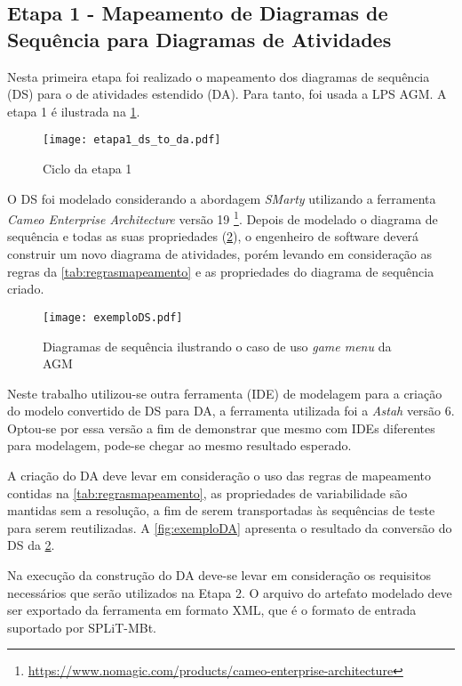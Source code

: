 \subsection{Etapa 1 - Mapeamento de Diagramas de Sequência para Diagramas de Atividades}
\label{cap3subsec:etapa1}

Nesta primeira etapa foi realizado o mapeamento dos diagramas de sequência (DS) para o de atividades estendido (DA). Para tanto, foi usada a LPS AGM. A etapa 1 é ilustrada na \ref{fig:SM_etapa1}. 

\begin{figure}[h!]
	\centering
	\texttt{[image: etapa1\_ds\_to\_da.pdf]}
	\caption{Ciclo da etapa 1}
	\label{fig:SM_etapa1}
\end{figure}


O DS foi modelado considerando a abordagem \textit{SMarty} utilizando a ferramenta \textit{Cameo Enterprise Architecture} versão 19 \footnote{\url{https://www.nomagic.com/products/cameo-enterprise-architecture}}. Depois de modelado o diagrama de sequência e todas as suas propriedades (\ref{fig:exemploDS}), o engenheiro de software deverá construir um novo diagrama de atividades, porém levando em consideração as regras da \ref{tab:regrasmapeamento} e as propriedades do diagrama de sequência criado.


\begin{figure}[h!]
	\centering
	\texttt{[image: exemploDS.pdf]}
	\caption{Diagramas de sequência ilustrando o caso de uso \textit{game menu} da AGM}
	\label{fig:exemploDS}
\end{figure}

Neste trabalho utilizou-se outra ferramenta (IDE) de modelagem para a criação do modelo convertido de DS para DA, a ferramenta utilizada foi a \textit{Astah} versão 6. Optou-se por essa versão a fim de demonstrar que mesmo com IDEs diferentes para modelagem, pode-se chegar ao mesmo resultado esperado.

A criação do DA deve levar em consideração o uso das regras de mapeamento contidas na \ref{tab:regrasmapeamento}, as propriedades de variabilidade são mantidas sem a resolução, a fim de serem transportadas às sequências de teste para serem reutilizadas. A \ref{fig:exemploDA} apresenta o resultado da conversão do DS da \ref{fig:exemploDS}.

Na execução da construção do DA deve-se levar em consideração os requisitos necessários que serão utilizados na Etapa 2. O arquivo do artefato modelado deve ser exportado da ferramenta em formato XML, que é o formato de entrada suportado por SPLiT-MBt.

